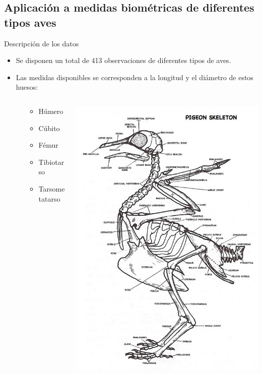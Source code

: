 \documentclass{beamer}
\begin{document}
\subsection{Aplicación a medidas biométricas de diferentes tipos aves}
\begin{frame}{Descripción de los datos}
\begin{itemize}
    \item Se disponen un total de 413 observaciones de diferentes tipos de aves.
    \item Las medidas disponibles se corresponden a la longitud y el diámetro de estos huesos:
    \begin{columns}
    \begin{column}{0.1\textwidth}
    \end{column}
    \begin{column}{0.5\textwidth}
    \begin{itemize}
        \item Húmero
        \item Cúbito
        \item Fémur
        \item Tibiotarso
        \item Tarsometatarso
    \end{itemize}
    \end{column}
    \begin{column}{0.4\textwidth}
    \includegraphics[scale=0.1]{img/bird.jpg}

\end{column}
\end{columns}
\end{itemize}
\end{frame}
\end{document}
